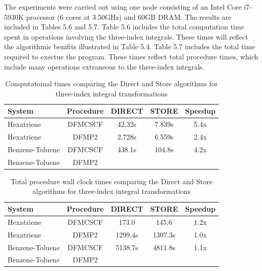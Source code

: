 The experiments were carried out using one node consisting of an Intel Core i7-5930K processor
(6 cores at 3.50GHz) and 60GB DRAM. The results are included in Tables 5.6 and 5.7. Table 5.6 includes
the total computation time spent in operations involving the three-index integrals. These times will
reflect the algorithmic benifits illustrated in Table 5.4. Table 5.7 includes the total time required
to exectue the program. These times reflect total procedure times, which include many operations extraneous
to the three-index integrals.

\begingroup
\begin{table}[H]
\centering
\renewcommand{\baselinestretch}{1}
\caption{Computatoinal times comparing the Direct and Store algorithms for three-index integral transformations}
\begin{tabular}{l cccc}
\multicolumn{1}{l}{\textbf{System}} &
\multicolumn{1}{c}{\textbf{Procedure}} &
\multicolumn{1}{c}{\textbf{DIRECT}} &
\multicolumn{1}{c}{\textbf{STORE}} &
\multicolumn{1}{c}{\textbf{Speedup}} \\ 
\hline
Hexatriene        & DFMCSCF & 42.32s  & 7.839s  &  5.4x  \\ 
Hexatriene        & DFMP2   & 2.728s  & 6.559s  &  2.4x  \\ 
Benzene-Toluene   & DFMCSCF & 438.1s  & 104.8s  &  4.2x  \\ 
Benzene-Toluene   & DFMP2   &      &   &    \\ 
\end{tabular}
\end{table}
\endgroup


\begingroup
\begin{table}[H]
\centering
\renewcommand{\baselinestretch}{1}
\caption{Total procedure wall clock times comparing the Direct and Store algorithms for three-index integral transformations}
\begin{tabular}{l cccc}
\multicolumn{1}{l}{\textbf{System}} &
\multicolumn{1}{c}{\textbf{Procedure}} &
\multicolumn{1}{c}{\textbf{DIRECT}} &
\multicolumn{1}{c}{\textbf{STORE}} &
\multicolumn{1}{c}{\textbf{Speedup}} \\ 
\hline
Hexatriene        & DFMCSCF & 173.0   & 145.6   &  1.2x  \\ 
Hexatriene        & DFMP2   & 1299.4s & 1307.3s &  1.0x  \\ 
Benzene-Toluene   & DFMCSCF & 5138.7s & 4811.8s &  1.1x  \\ 
Benzene-Toluene   & DFMP2   &   &   &    \\ 
\end{tabular}
\end{table}
\endgroup

